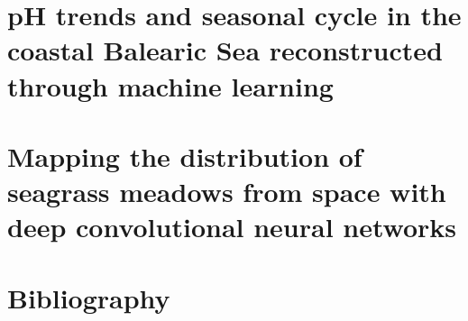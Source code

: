 \documentclass[
	10pt, %
	fleqn, %
	a4paper, %
]{LegrandOrangeBook}
\begin{document}
\chapter{pH trends and seasonal cycle in the coastal Balearic Sea reconstructed
  through machine learning}
%

\chapterspaceabove{6.75cm}
\chapterspacebelow{7.25cm}

\chapter{Mapping the distribution of seagrass meadows from space with deep
  convolutional neural networks}
%

\stopcontents[part] %


\chapterimage{} %
\chapterspaceabove{2.5cm} %
\chapterspacebelow{2cm} %


\chapter*{Bibliography}
\printbibliography


\end{document}
